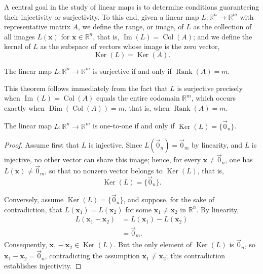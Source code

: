 A central goal in the study of linear maps is to determine conditions guaranteeing their injectivity or surjectivity. To this end, given a linear map $L : \mathbb{R}^n \to \mathbb{R}^m$ with representative matrix $A$, we define the range, or image, of $L$ as the collection of all images $L(\mathbf{x})$ for $\mathbf{x} \in \mathbb{R}^n$, that is, $\operatorname{Im}(L) = \operatorname{Col}(A)$; and we define the kernel of $L$ as the subspace of vectors whose image is the zero vector,
\[
\operatorname{Ker}(L) = \operatorname{Ker}(A).
\]

\begin{theorem}
The linear map $L : \mathbb{R}^n \to \mathbb{R}^m$ is surjective if and only if $\operatorname{Rank}(A) = m$.
\end{theorem}

This theorem follows immediately from the fact that $L$ is surjective precisely when $\operatorname{Im}(L) = \operatorname{Col}(A)$ equals the entire codomain $\mathbb{R}^m$, which occurs exactly when $\operatorname{Dim}(\operatorname{Col}(A)) = m$, that is, when $\operatorname{Rank}(A) = m$.

\begin{theorem}[Injectivity]
The linear map $L : \mathbb{R}^n \to \mathbb{R}^m$ is one-to-one if and only if $\operatorname{Ker}(L) = \{\vec{0}_n\}$.
\end{theorem}

\begin{proof}
Assume first that $L$ is injective. Since $L(\vec{0}_n) = \vec{0}_m$ by linearity, and $L$ is injective, no other vector can share this image; hence, for every $\mathbf{x} \neq \vec{0}_n$, one has $L(\mathbf{x}) \neq \vec{0}_m$, so that no nonzero vector belongs to $\operatorname{Ker}(L)$, that is,
\[
\operatorname{Ker}(L) = \{\vec{0}_n\}.
\]

Conversely, assume $\operatorname{Ker}(L) = \{\vec{0}_n\}$, and suppose, for the sake of contradiction, that $L(\mathbf{x}_1) = L(\mathbf{x}_2)$ for some $\mathbf{x}_1 \neq \mathbf{x}_2$ in $\mathbb{R}^n$. By linearity,
\[
\begin{aligned}
L(\mathbf{x}_1 - \mathbf{x}_2) &= L(\mathbf{x}_1) - L(\mathbf{x}_2) \\
&= \vec{0}_m.
\end{aligned}
\]
Consequently, $\mathbf{x}_1 - \mathbf{x}_2 \in \operatorname{Ker}(L)$. But the only element of $\operatorname{Ker}(L)$ is $\vec{0}_n$, so $\mathbf{x}_1 - \mathbf{x}_2 = \vec{0}_n$, contradicting the assumption $\mathbf{x}_1 \neq \mathbf{x}_2$; this contradiction establishes injectivity.
\end{proof}

